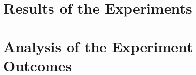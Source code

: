 \section{Results of the Experiments}
\label{sec:evaluation:results}

\Blindtext

\section{Analysis of the Experiment Outcomes}
\label{sec:evaluation:analysis}

\Blindtext
